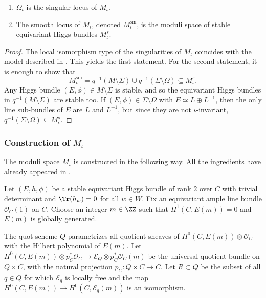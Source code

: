 \skpt
\begin{prop}\label{prop:singMiota}
\begin{enumerate}
\item\label{item:singlocus} $\Omega_\iota$ is the singular locus of $M_{\iota}$.
\item\label{item:smoothlocus} The smooth locus of $M_{\iota}$, denoted $M_{\iota}^{\mathrm{sm}}$, is the moduli space of stable equivariant Higgs bundles $M^{s}_{\iota}$.
\end{enumerate}
\end{prop}
\begin{proof}
The local isomorphism type of the singularities of $M_{\iota}$ coincides with the model described in \cite[Lem.\,3.1]{MRS18}. This yields the first statement. For the second statement, it is enough to show that
\[
M_{\iota}^{\mathrm{sm}} = q^{-1}(M \setminus \Sigma) \cup q^{-1}(\Sigma \setminus \Omega) \subseteq M^{s}_{\iota}.
\]
Any Higgs bundle $(E, \phi) \in M \setminus \Sigma$ is stable, and so the equivariant Higgs bundles in $q^{-1}(M \setminus \Sigma)$ are stable too. If $(E, \phi) \in \Sigma \setminus \Omega$ with $E \simeq L \oplus L^{-1}$, then the only line sub-bundles of $E$ are $L$ and $L^{-1}$, but since they are not $\iota$-invariant, $q^{-1}(\Sigma \setminus \Omega) \subseteq M^{s}_{\iota}$.
\end{proof}

\subsubsection{Construction of $M_{\iota}$}\label{sec:constructionMi}
The moduli space $M_{\iota}$ is constructed in the following way. All the ingredients have already appeared in \cite{Seshadri70, Nitsure91, Hausel98}.

Let $(E,h,\phi)$ be a stable equivariant Higgs bundle of rank $2$ over $C$ with trivial determinant and $\Tr(h_{w})=0$ for all $w \in W$. Fix an equivariant ample line bundle $\mathcal{O}_C(1)$ on $C$. Choose an integer $m \in \ZZ$ such that $H^1(C, E(m))=0$ and $E(m)$ is globally generated.

The quot scheme $Q$ parametrizes all quotient sheaves of $H^0(C, E(m)) \otimes \mathcal{O}_C$ with the Hilbert polynomial of $E(m)$. Let $H^0(C, E(m)) \otimes p_C^*\mathcal{O}_{C} \to \mathcal{E}_Q \otimes p_C^*\mathcal{O}_C(m)$ be the universal quotient bundle on $Q \times C$, with the natural projection $p_C \colon Q \times C \to C$. Let $R \subset Q$ be the subset of all $q \in Q$ for which $\mathcal{E}_q$ is locally free and the map $H^0(C, E(m)) \to H^0(C, \mathcal{E}_q(m))$ is an isomorphism.

